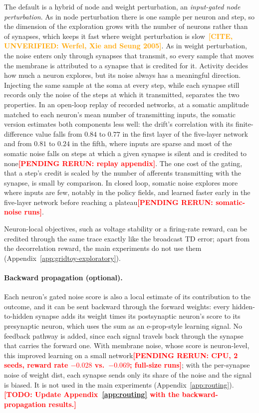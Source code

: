 \documentclass[10pt,twocolumn]{article}
\newcommand{\pending}[1]{\textcolor{red}{\bfseries[PENDING RERUN#1]}}
\newcommand{\unverified}[1]{\textcolor{orange}{\bfseries[CITE, UNVERIFIED: #1]}}
\newcommand{\todo}[1]{\textcolor{red}{\bfseries[TODO: #1]}}
\newcommand{\variant}[1]{\textsf{#1}} %
\begin{document}
The default is a hybrid of node and weight perturbation, an \emph{input-gated node
perturbation}. As in node perturbation there is one sample per neuron and step, so
the dimension of the exploration grows with the number of neurons rather than of
synapses, which keeps it fast where weight perturbation is
slow~\unverified{Werfel, Xie and Seung 2005}. As in weight perturbation, the noise
enters only through synapses that transmit, so every sample that moves the membrane
is attributed to a synapse that is credited for it. Activity decides how much a
neuron explores, but its noise always has a meaningful direction. Injecting the same
sample at the soma at every step, while each synapse still records only the noise of
the steps at which it transmitted, separates the two properties. In an open-loop
replay of recorded networks, at a somatic amplitude matched to each neuron's mean
number of transmitting inputs, the somatic version estimates both components less
well: the drift's correlation with its finite-difference value falls from $0.84$ to
$0.77$ in the first layer of the five-layer network and from $0.81$ to $0.24$ in the
fifth, where inputs are sparse and most of the somatic noise falls on steps at which
a given synapse is silent and is credited to none\pending{: replay appendix}. The
one cost of the gating, that a step's credit is scaled by the number of afferents
transmitting with the synapse, is small by comparison. In closed loop, somatic noise
explores more where inputs are few, notably in the policy fields, and learned faster
early in the five-layer network before reaching a plateau\pending{: somatic-noise
runs}.

Neuron-local objectives, such as voltage stability or a firing-rate
reward, can be credited through the same trace exactly like the broadcast TD error;
apart from the decorrelation reward, the main experiments do not use them
(Appendix~\ref{app:gridtoy-exploratory}).

\paragraph{Backward propagation (optional).}
Each neuron's gated noise score is also a local estimate of its contribution to the
outcome, and it can be sent backward through the forward weights: every
hidden-to-hidden synapse adds its weight times its postsynaptic neuron's score to its
presynaptic neuron, which uses the sum as an e-prop-style learning signal. No feedback
pathway is added, since each signal travels back through the synapse that carries the
forward one. With membrane noise, whose score is neuron-level, this improved learning
on a small network\pending{: CPU, 2 seeds, reward rate $-0.028$ vs.\ $-0.069$;
full-size runs}; with the per-synapse noise of \variant{weight dist}, each synapse sends
only its share of the noise and the signal is biased. It is not used in the main
experiments (Appendix~\ref{app:routing}).\todo{Update Appendix~\ref{app:routing} with
the backward-propagation results.}
\end{document}
